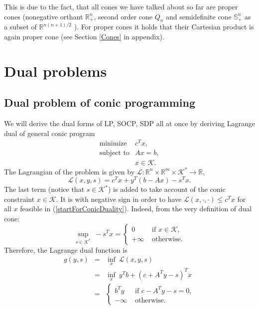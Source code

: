 \documentclass[12pt]{book}
\theoremstyle{definition}
\begin{document}
This is due to the fact, that all cones we have talked about so far are proper cones (nonegative orthant $\mathbb{R}^n_+$, second order cone $Q_n$ and semidefinite cone $\mathbb{S}^n_+$ as a subset of $ \mathbb{R}^{n(n+1)/2}$ ). 
For proper cones it holds that their Cartesian product is again proper cone (see Section \ref{Cones} in appendix).  

\section{Dual problems}


\subsection{Dual problem of conic programming}

We will derive the dual forms of LP, SOCP, SDP all at once by deriving Lagrange dual of general conic program
\begin{equation}
\label{startForConicDuality}
\begin{array}{ll}
\mbox{minimize} & c^Tx,\\
\mbox{subject to}& Ax = b,\\
& x \in \mathcal{K}.
\end{array} 
\end{equation}
The Lagrangian of the problem is given by $\mathcal{L}:\mathbb{R}^n\times\mathbb{R}^m\times\mathcal{K}^*\rightarrow \mathbb{R},$
\begin{equation}
\mathcal{L}(x,y,s) = c^Tx + y^T(b-Ax) - s^Tx. %
\end{equation}
The last term (notice that $s\in\mathcal{K}^*$) is added to take account of the conic constraint $x\in \mathcal{K}$.  
It is with negative sign in order to have $\mathcal{L}(x,\cdot,\cdot)\leq c^Tx$ for all $x$ feasible in (\ref{startForConicDuality}). 
Indeed, from the very definition of dual cone:
\begin{equation}
\sup_{s\in \mathcal{K}^*} \ -s^Tx = 
\left\lbrace \begin{array}{ll} 
0 & \mbox{ if } x\in\mathcal{K},\\ 
+\infty & \mbox{ otherwise.}
\end{array}\right. 
\end{equation}
Therefore, the Lagrange dual function is 
\begin{eqnarray}
g(y,s) &=& \inf_x \ \mathcal{L}(x,y,s) \\
&=& \inf_x \ y^Tb + (c+A^Ty -s)^Tx \\
&=& \left\lbrace \begin{array}{ll} 
b^Ty & \mbox{ if } c-A^Ty - s = 0,\\ 
-\infty & \mbox{ otherwise.}
\end{array}\right. 
\end{eqnarray}
\end{document}
